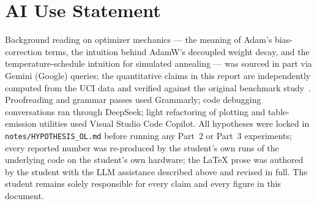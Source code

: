 \documentclass[conference]{IEEEtran}
\begin{document}
\section*{AI Use Statement}
Background reading on optimizer mechanics --- the meaning of Adam's
bias-correction terms, the intuition behind AdamW's decoupled weight decay,
and the temperature-schedule intuition for simulated annealing --- was sourced
in part via Gemini (Google) queries; the quantitative claims in this report
are independently computed from the UCI data and verified against the original
benchmark study~\cite{blackard1999}.
Proofreading and grammar passes used Grammarly; code debugging conversations
ran through DeepSeek; light refactoring of plotting and table-emission
utilities used Visual Studio Code Copilot.
All hypotheses were locked in \texttt{notes/HYPOTHESIS\_OL.md} before running
any Part~2 or Part~3 experiments; every reported number was re-produced by the
student's own runs of the underlying code on the student's own hardware; the
\LaTeX{} prose was authored by the student with the LLM assistance described
above and revised in full.
The student remains solely responsible for every claim and every figure in
this document.
\end{document}
